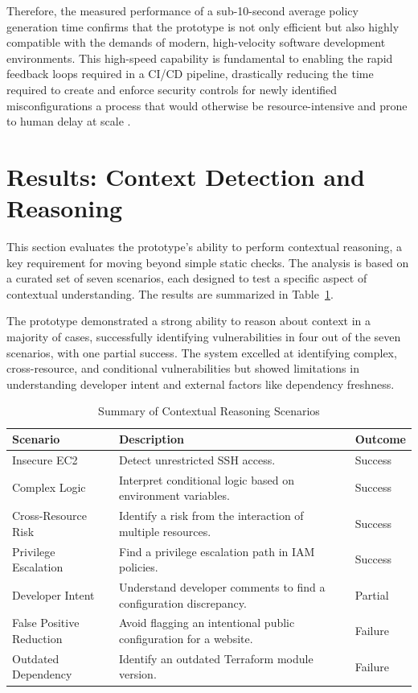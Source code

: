 Therefore, the measured performance of a sub-10-second average policy generation time confirms that the prototype is not only efficient but also highly compatible with the demands of modern, high-velocity software development environments. This high-speed capability is fundamental to enabling the rapid feedback loops required in a CI/CD pipeline, drastically reducing the time required to create and enforce security controls for newly identified misconfigurations a process that would otherwise be resource-intensive and prone to human delay at scale \cite{vaidya_devsecops_2024}.

\section{Results: Context Detection and Reasoning}\label{sec:results-context}

This section evaluates the prototype's ability to perform contextual reasoning, a key requirement for moving beyond simple static checks. The analysis is based on a curated set of seven scenarios, each designed to test a specific aspect of contextual understanding. The results are summarized in Table~\ref{tab:context-reasoning-summary}.

The prototype demonstrated a strong ability to reason about context in a majority of cases, successfully identifying vulnerabilities in four out of the seven scenarios, with one partial success. The system excelled at identifying complex, cross-resource, and conditional vulnerabilities but showed limitations in understanding developer intent and external factors like dependency freshness.

\begin{table}[htbp]
	\centering
	\caption{Summary of Contextual Reasoning Scenarios}\label{tab:context-reasoning-summary}
	\begin{tabular}{p{}p{}l}
		\hline
		\textbf{Scenario} & \textbf{Description} & \textbf{Outcome} \\
		\hline
		Insecure EC2 & Detect unrestricted SSH access. & Success \\
		Complex Logic & Interpret conditional logic based on environment variables. & Success \\
		Cross-Resource Risk & Identify a risk from the interaction of multiple resources. & Success \\
		Privilege Escalation & Find a privilege escalation path in IAM policies. & Success \\
		Developer Intent & Understand developer comments to find a configuration discrepancy. & Partial \\
		False Positive Reduction & Avoid flagging an intentional public configuration for a website. & Failure \\
		Outdated Dependency & Identify an outdated Terraform module version. & Failure \\
		\hline
	\end{tabular}
\end{table}

